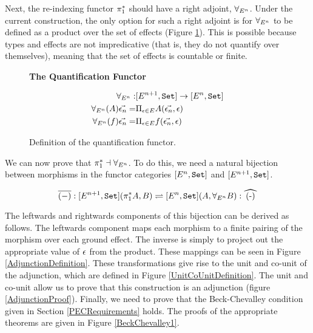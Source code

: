 Next, the re-indexing functor $\pi_1^*$ should have a right adjoint, $\forall_{E^n}$. Under the current construction, the only option for such a right adjoint is for $\forall_{E^n}$ to be defined as a product over the set of effects (Figure \ref{ProductQuantification}). This is possible because types and effects are not impredicative (that is, they do not quantify over themselves), meaning that the set of effects is countable or finite.

\begin{figure}
    \begin{framed}
        \centering
        \textbf{The Quantification Functor}

        \begin{align*}
            \forall_{E^n}:& [E^{n+1}, \texttt{Set}] \rightarrow [E^n, \texttt{Set}]\\
            \forall_{E^n}(A)\vec{\epsilon_n} =&\Pi_{\epsilon\in E}{A(\vec{\epsilon_n}, \epsilon)}
            \\ 
            \forall_{E^n}(f)\vec{\epsilon_n} =&\Pi_{\epsilon\in E}{f(\vec{\epsilon_n}, \epsilon)}
        \end{align*}
        
    \end{framed}
    \caption{Definition of the quantification functor.}
    \label{ProductQuantification}
\end{figure}



We can now prove that $\pi_1^* \dashv \forall_{E^n}$. To do this, we need a natural bijection between morphisms in the functor categories $[E^n, \texttt{Set}]$ and $[E^{n+1}, \texttt{Set}]$.

\begin{equation}
    \bar{(-)}: [E^{n+1}, \set](\pstar A, B) \rightleftharpoons [E^n,\set] (A, \allEn B): \widehat{(-)}
\end{equation}

The leftwards and rightwards components of this bijection can be derived as follows. The leftwards component maps each morphism to a finite pairing of the morphism over each ground effect. The inverse is simply to project out the appropriate value of $\epsilon$ from the product. These mappings can be seen in Figure \ref{AdjunctionDefinition}. These transformations give rise to the unit and co-unit of the adjunction, which are defined in Figure \ref{UnitCoUnitDefinition}. The unit and co-unit allow us to prove that this construction is an adjunction (figure \ref{AdjunctionProof}).  Finally, we need to prove that the Beck-Chevalley condition given in Section \ref{PECRequirements} holds. The proofs of the appropriate theorems are given in Figure \ref{BeckChevalley1}.




